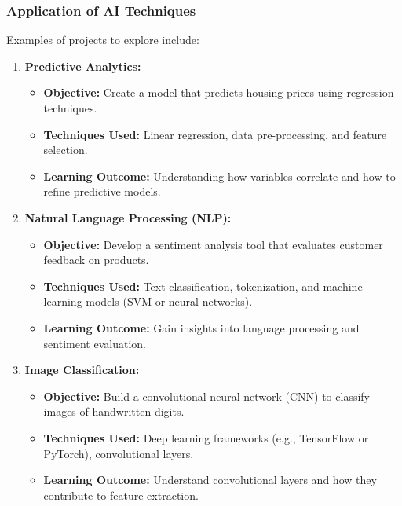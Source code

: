 \documentclass{beamer}
\begin{document}
\begin{frame}[fragile]
    \frametitle{Application of AI Techniques}
    Examples of projects to explore include:
    
    \begin{enumerate}
        \item \textbf{Predictive Analytics:}
            \begin{itemize}
                \item \textbf{Objective:} Create a model that predicts housing prices using regression techniques.
                \item \textbf{Techniques Used:} Linear regression, data pre-processing, and feature selection.
                \item \textbf{Learning Outcome:} Understanding how variables correlate and how to refine predictive models.
            \end{itemize}
        
        \item \textbf{Natural Language Processing (NLP):}
            \begin{itemize}
                \item \textbf{Objective:} Develop a sentiment analysis tool that evaluates customer feedback on products.
                \item \textbf{Techniques Used:} Text classification, tokenization, and machine learning models (SVM or neural networks).
                \item \textbf{Learning Outcome:} Gain insights into language processing and sentiment evaluation.
            \end{itemize}
        
        \item \textbf{Image Classification:}
            \begin{itemize}
                \item \textbf{Objective:} Build a convolutional neural network (CNN) to classify images of handwritten digits.
                \item \textbf{Techniques Used:} Deep learning frameworks (e.g., TensorFlow or PyTorch), convolutional layers.
                \item \textbf{Learning Outcome:} Understand convolutional layers and how they contribute to feature extraction.
            \end{itemize}
    \end{enumerate}
\end{frame}
\end{document}
